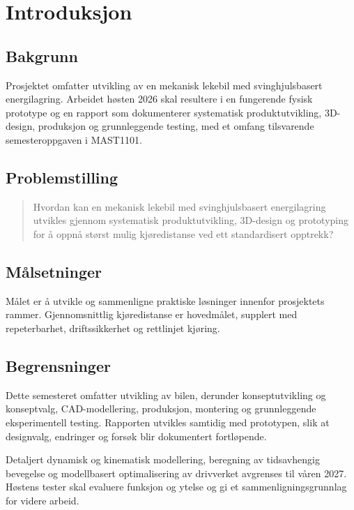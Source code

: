 \section{Introduksjon}
\label{sec:introduksjon}
\subsection{Bakgrunn}
Prosjektet omfatter utvikling av en mekanisk lekebil med svinghjulsbasert energilagring. Arbeidet høsten 2026 skal resultere i en fungerende fysisk prototype og en rapport som dokumenterer systematisk produktutvikling, 3D-design, produksjon og grunnleggende testing, med et omfang tilsvarende semesteroppgaven i MAST1101.

\subsection{Problemstilling}
\begin{quote}
Hvordan kan en mekanisk lekebil med svinghjulsbasert energilagring utvikles gjennom systematisk produktutvikling, 3D-design og prototyping for å oppnå størst mulig kjøredistanse ved ett standardisert opptrekk?
\end{quote}

\subsection{Målsetninger}
Målet er å utvikle og sammenligne praktiske løsninger innenfor prosjektets rammer. Gjennomsnittlig kjøredistanse er hovedmålet, supplert med repeterbarhet, driftssikkerhet og rettlinjet kjøring.

\subsection{Begrensninger}
Dette semesteret omfatter utvikling av bilen, derunder konseptutvikling og konseptvalg, CAD-modellering, produksjon, montering og grunnleggende eksperimentell testing. Rapporten utvikles samtidig med prototypen, slik at designvalg, endringer og forsøk blir dokumentert fortløpende.

Detaljert dynamisk og kinematisk modellering, beregning av tidsavhengig bevegelse og modellbasert optimalisering av drivverket avgrenses til våren 2027. Høstens tester skal evaluere funksjon og ytelse og gi et sammenligningsgrunnlag for videre arbeid.
